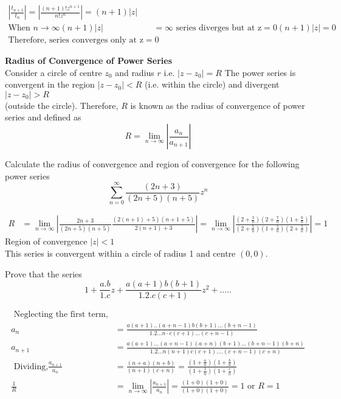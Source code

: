 \begin{answer}
	\begin{align*}
	\left|\frac{t_{n+1}}{t_{n}}\right|=\left|\frac{(n+1) ! z^{n+1}}{n ! z^{n}}\right|=(n+1)|z|\\
	\text{When }n \rightarrow \infty(n+1)|z|&=\infty\text{ series diverges but at }\mathrm{z}=0(n+1)|z|=0\\
	 \text{Therefore, series converges only at }\mathrm{z}=0
	\end{align*}
\end{answer}
\textbf{Radius of Convergence of Power Series}\\
Consider a circle of centre $z_{0}$ and radius $r$ i.e. $\left|z-z_{0}\right|=R$
The power series is convergent in the region $\left|z-z_{0}\right|<R$ (i.e. within the circle) and divergent $\left|z-z_{0}\right|>R$\\ (outside the circle). Therefore, $R$ is known as the radius of convergence of power series and defined as\\
$$R=\lim _{n \rightarrow \infty}\left|\frac{a_{n}}{a_{n+1}}\right|$$
\begin{exercise}
	Calculate the radius of convergence and region of convergence for the following power series
	$$
	\sum_{n=0}^{\infty} \frac{(2 n+3)}{(2 n+5)(n+5)} z^{n}
	$$
\end{exercise}
\begin{answer}
	\begin{align*}
	R&=\lim _{n \rightarrow \infty}\left|\frac{2 n+3}{(2 n+5)(n+5)} \frac{(2(n+1)+5)(n+1+5)}{2(n+1)+3}\right|=\lim _{n \rightarrow \infty}\left|\frac{\left(2+\frac{3}{n}\right)\left(2+\frac{7}{n}\right)\left(1+\frac{6}{n}\right)}{\left(2+\frac{5}{n}\right)\left(1+\frac{5}{n}\right)\left(2+\frac{5}{n}\right)}\right|=1
	\end{align*}
	Region of convergence $|z|<1$\\
	This series is convergent within a circle of radius 1 and centre $(0,0)$.
\end{answer}
\begin{exercise}
	Prove that the series
	$$
	1+\frac{a . b}{1 . c} z+\frac{a(a+1) b(b+1)}{1.2 . c(c+1)} z^{2}+\ldots . .
	$$
\end{exercise}
\begin{answer}
	\begin{align*}
\text{	Neglecting the first term,}\\
	a_{n}&=\frac{a(a+1) . .(a+n-1) b(b+1) \ldots(b+n-1)}{1.2 \ldots n \cdot c(c+1) \ldots(c+n-1)} \\
	a_{n+1}&=\frac{a(a+1) \ldots(a+n-1)(a+n)(b+1) \ldots(b+n-1)(b+n)}{1.2 \ldots n(n+1) c(c+1) \ldots .(c+n-1)(c+n)}\\
\text{	Dividing,} \frac{a_{n+1}}{a_{n}}&=\frac{(n+a)(n+b)}{(n+1)(c+n)}=\frac{\left(1+\frac{a}{n}\right)\left(1+\frac{b}{n}\right)}{\left(1+\frac{1}{n}\right)\left(1+\frac{c}{n}\right)}\\
	\frac{1}{R}&=\lim _{n \rightarrow \infty}\left|\frac{a_{n+1}}{a_{n}}\right|=\frac{(1+0)(1+0)}{(1+0)(1+0)}=1 \text { or } R=1
	\end{align*}
\end{answer}
